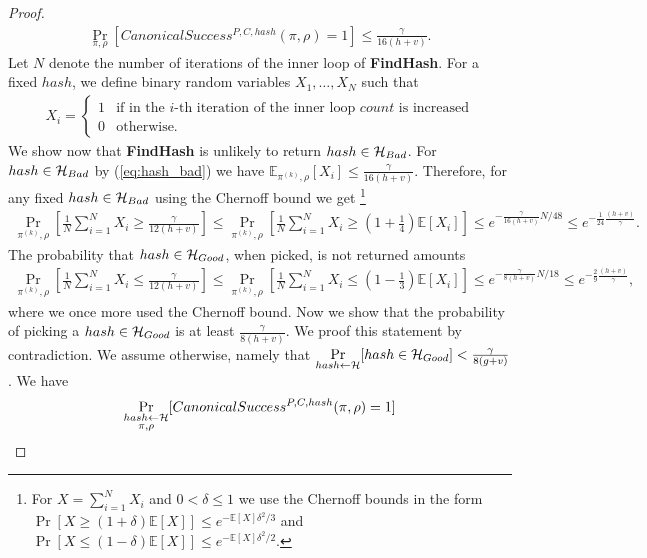 \begin{proof}
\begin{align}
  \label{eq:hash_bad}
\underset{\pi, \rho}{\Pr}\left[CanonicalSuccess^{P, C, hash}(\pi, \rho) = 1\right] \leq \frac{\gamma}{16(h+v)}.
\end{align}
%
Let $N$ denote the number of iterations of the inner loop of \textbf{FindHash}.
For a fixed $hash$, we define binary random variables $X_1, \dots, X_{N}$ such that
\begin{align*}
  X_i =
  \begin{cases}
    1 & \text{if in the $i$-th iteration of the inner loop $count$ is increased}\\
    0 & \text{otherwise.}
  \end{cases}
\end{align*}
We show now that \textbf{FindHash} is unlikely to return $hash \in \mathcal{H}_{Bad}$.
For $hash \in \mathcal{H}_{Bad}$ by (\ref{eq:hash_bad}) we have $\mathbb{E}_{\pi^{(k)},\rho}[X_i] \leq \frac{\gamma}{16(h+v)}$.
Therefore, for any fixed $hash \in \mathcal{H}_{Bad}$ using the Chernoff bound we get
\footnote{For $X = \sum_{i=1}^N X_i$ and $0 < \delta \leq 1$ we use the Chernoff bounds in the form
$\Pr[X \geq (1+\delta) \mathbb{E}[X]] \leq e^{- \mathbb{E}[X] \delta^2/3}$ and
$\Pr[X \leq (1-\delta) \mathbb{E}[X]] \leq e^{- \mathbb{E}[X] \delta^2/2}$.}
\begin{align*}
  \underset{\pi^{(k)},\rho}{\Pr} \left[\frac{1}{N} \sum_{i=1}^{N} X_i \geq \frac{\gamma}{12(h+v)} \right] \leq
  \underset{\pi^{(k)}, \rho}{\Pr}\left[\frac{1}{N} \sum_{i=1}^{N} X_i \geq (1 + \frac{1}{4}) \mathbb{E}[X_i]\right] \leq
  e^{-{\frac{\gamma}{16(h+v)}} N /48} \leq e^{-\frac{1}{24}\frac{(h+v)}{\gamma}}.
\end{align*}
%
The probability that $hash \in \mathcal{H}_{Good}$, when picked, is not returned amounts
\begin{align*}
  \underset{\pi^{(k)}, \rho}{\Pr}\left[\frac{1}{N} \sum_{i=1}^{N} X_i \leq \frac{\gamma}{12(h+v)}\right] \leq
  \underset{\pi^{(k)}, \rho}{\Pr}\left[\frac{1}{N} \sum_{i=1}^{N} X_i \leq (1 - \frac{1}{3})\mathbb{E}[X_i]\right]
  \leq e^{-{\frac{\gamma}{8(h+v)}} N / 18} \leq e^{-\frac{2}{9} \frac{(h+v)}{\gamma}},
\end{align*}
where we once more used the Chernoff bound.
Now we show that the probability of picking a $hash \in \mathcal{H}_{Good}$ is at least $\frac{\gamma}{8(h+v)}$.
We proof this statement by contradiction. We assume otherwise, namely that
$\underset{hash \leftarrow \mathcal{H}}{\Pr}[hash \in \mathcal{H}_{Good}] < \frac{\gamma}{8(g+v)}$.
We have
\begin{align*}
  &\underset{\substack{hash \leftarrow \cH \\ \pi, \rho}}{\Pr}[CanonicalSuccess^{P,C,hash}(\pi, \rho) = 1] \\

\end{align*}
\end{proof}
